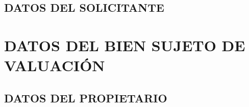\section{DATOS DEL SOLICITANTE}\label{sec:b}


\espacio{3cm}

\chapter{DATOS DEL BIEN SUJETO DE VALUACI\'ON}\label{cap:2}
\thispagestyle{fancy}
\setcounter{section}{2}
\section{DATOS DEL PROPIETARIO}\label{sec:c}
